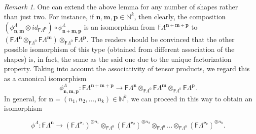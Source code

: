 \documentclass[12pt]{amsart}
\newcommand{\N}{\mathbf{n}}
\newcommand{\M}{\mathbf{m}}
\theoremstyle{definition}
\theoremstyle{remark}
\newtheorem{rmk}[thm]{Remark}
\begin{document}
\begin{rmk}\label{rem the general splitting}
One can extend the above lemma for any number of shapes rather than just two. For instance, if $\N,\M,\mathbf{p}\in \mathbb{N}^k$, then clearly, the composition $(\phi_{\N,\M}^\Lambda \otimes id_{\mathsf{F}\Lambda^\mathbf{p}})\circ \phi_{\N+\M,\mathbf{p}}^\Lambda$ is an isomorphism from $\mathsf{F}\Lambda^{\N+\M+\mathbf{p}}$ to $(\mathsf{F}\Lambda^\N\otimes_{\mathsf{F}\Lambda^0} \mathsf{F}\Lambda^\M)\otimes_{\mathsf{F}\Lambda^0}\mathsf{F}\Lambda^\mathbf{p}$. The readers should be convinced that the other possible isomorphism of this type (obtained from different association of the shapes) is, in fact, the same as the said one due to the unique factorization property. Taking into account the associativity of tensor products, we regard this as a canonical isomorphism 
\[\phi_{\N,\M,\mathbf{p}}^\Lambda:\mathsf{F}\Lambda^{\N+\M+\mathbf{p}}\longrightarrow \mathsf{F}\Lambda^\N\otimes_{\mathsf{F}\Lambda^0}\mathsf{F}\Lambda^\M\otimes_{\mathsf{F}\Lambda^0}\mathsf{F}\Lambda^\mathbf{p}.\] 
In general, for $\N=(n_1,n_2,\ldots,n_k)\in \mathbb{N}^k$, we can proceed in this way to obtain an isomorphism 

\[\phi^\Lambda:\mathsf{F}\Lambda^\N \longrightarrow (\mathsf{F}\Lambda^{\mathbf{e}_1})^{\otimes n_1}\otimes_{\mathsf{F}\Lambda^0}(\mathsf{F}\Lambda^{\mathbf{e}_2})^{\otimes n_2}\otimes_{\mathsf{F}\Lambda^0}\dots \otimes_{\mathsf{F}\Lambda^0}(\mathsf{F}\Lambda^{\mathbf{e}_k})^{\otimes n_k}.\]
\end{rmk}
\end{document}
